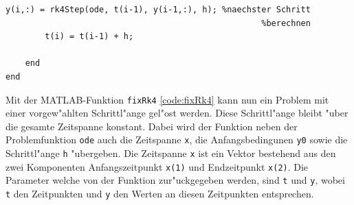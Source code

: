 \begin{refsection}
\begin{lstlisting}[style=MATLAB, caption=Konstante Schrittl"ange, captionpos=b, label=code:fixRk4]
        y(i,:) = rk4Step(ode, t(i-1), y(i-1,:), h); %naechster Schritt
                                                    %berechnen
        t(i) = t(i-1) + h;                             

    end
end
\end{lstlisting}

Mit der MATLAB-Funktion \texttt{fixRk4} \ref{code:fixRk4} kann nun ein Problem mit einer vorgew"ahlten Schritt\-l"ange gel"ost werden.
Diese Schrittl"ange bleibt "uber die gesamte Zeitspanne konstant.
Dabei wird der Funktion neben der Problemfunktion \texttt{ode} auch die Zeitspanne \texttt{x}, die Anfangsbedingunen \texttt{y0} sowie die Schrittl"ange \texttt{h} "ubergeben.
Die Zeitspanne \texttt{x} ist ein Vektor bestehend aus den zwei Komponenten Anfangszeitpunkt \texttt{x(1)} und Endzeitpunkt \texttt{x(2)}.
Die Parameter welche von der Funktion zur"uckgegeben werden, sind \texttt{t} und \texttt{y}, wobei \texttt{t} den Zeitpunkten und \texttt{y} den Werten an diesen Zeitpunkten entsprechen.


\end{refsection}
